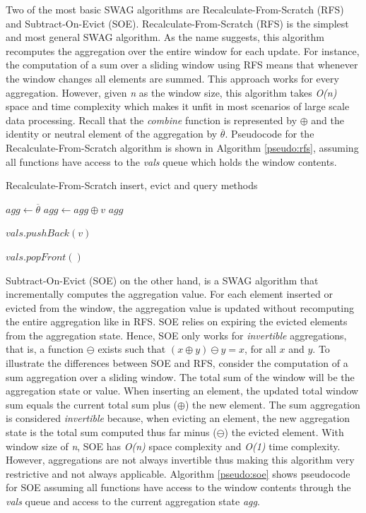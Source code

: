 Two of the most basic SWAG algorithms are Recalculate-From-Scratch (RFS) and Subtract-On-Evict (SOE). Recalculate-From-Scratch (RFS) is the simplest and most general SWAG algorithm. As the name suggests, this algorithm recomputes the aggregation over the entire window for each update. For instance, the computation of a sum over a sliding window using RFS means that whenever the window changes all elements are summed. This approach works for every aggregation. However, given \textit{n} as the window size, this algorithm takes \textit{O(n)} space and time complexity which makes it unfit in most scenarios of large scale data processing. Recall that the \textit{combine} function is represented by $\oplus$ and the identity or neutral element of the aggregation by $\overline{\theta}$. Pseudocode for the Recalculate-From-Scratch algorithm is shown in Algorithm \ref{pseudo:rfs}, assuming all functions have access to the \textit{vals} queue which holds the window contents.
  

\begin{algorithm}
    \caption[Recalculate-From-Scratch]{Recalculate-From-Scratch insert, evict and query methods}
    \label{pseudo:rfs}
    \begin{algorithmic}[1]
            \State $agg\gets\overline{\theta}$
                \State $agg \gets agg \oplus v$
            \EndFor
            \State \Return $agg$
        \EndFunction
        
            \State $vals.pushBack(v)$
        \EndFunction
        
            \State $vals.popFront()$
        \EndFunction
    \end{algorithmic}
\end{algorithm}

Subtract-On-Evict (SOE) on the other hand, is a SWAG algorithm that incrementally computes the aggregation value. For each element inserted or evicted from the window, the aggregation value is updated without recomputing the entire aggregation like in RFS. SOE relies on expiring the evicted elements from the aggregation state. Hence, SOE only works for \textit{invertible} aggregations, that is, a function $\ominus$ exists such that $(x \oplus y) \ominus y = x$, for all $x$ and $y$. To illustrate the differences between SOE and RFS, consider the computation of a sum aggregation over a sliding window. The total sum of the window will be the aggregation state or value. When inserting an element, the updated total window sum equals the current total sum plus ($\oplus$) the new element. The sum aggregation is considered \textit{invertible} because, when evicting an element, the new aggregation state is the total sum computed thus far minus ($\ominus$) the evicted element. With window size of \textit{n}, SOE has \textit{O(n)} space complexity and \textit{O(1)} time complexity. However, aggregations are not always invertible thus making this algorithm very restrictive and not always applicable. Algorithm \ref{pseudo:soe} shows pseudocode for SOE assuming all functions have access to the window contents through the \textit{vals} queue and access to the current aggregation state \textit{agg}.

